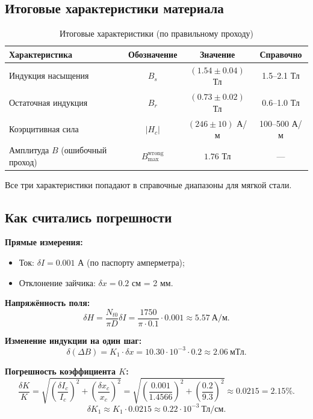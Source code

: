 \documentclass[a4paper]{article}
\begin{document}
	\subsection{Итоговые характеристики материала}
	
	\begin{table}[h]
		\centering
		\caption{Итоговые характеристики (по правильному проходу)}
		\label{tab:numerical_results}
		\begin{tabular}{|l|c|c|c|}
			\hline
			Характеристика & Обозначение & Значение & Справочно \\
			\hline
			Индукция насыщения & $B_s$ & $(1.54 \pm 0.04)$ Тл & 1.5--2.1 Тл \\
			\hline
			Остаточная индукция & $B_r$ & $(0.73 \pm 0.02)$ Тл & 0.6--1.0 Тл \\
			\hline
			Коэрцитивная сила & $|H_c|$ & $(246 \pm 10)$ А/м & 100--500 А/м \\
			\hline
			Амплитуда $B$ (ошибочный проход) & $B_{\max}^{\text{wrong}}$ & $1.76$ Тл & --- \\
			\hline
		\end{tabular}
	\end{table}
	
	Все три характеристики попадают в справочные диапазоны для мягкой стали.
	
	\subsection{Как считались погрешности}
	
	\textbf{Прямые измерения:}
	\begin{itemize}
		\item Ток: $\delta I = 0.001$ А (по паспорту амперметра);
		\item Отклонение зайчика: $\delta x = 0.2$ см = 2 мм.
	\end{itemize}
	
	\textbf{Напряжённость поля:}
	\[
	\delta H = \frac{N_{t0}}{\pi D} \delta I = \frac{1750}{\pi \cdot 0.1} \cdot 0.001 \approx 5.57 \ \text{А/м}.
	\]
	
	\textbf{Изменение индукции на один шаг:}
	\[
	\delta(\Delta B) = K_1 \cdot \delta x = 10.30 \cdot 10^{-3} \cdot 0.2 \approx 2.06 \ \text{мТл}.
	\]
	
	\textbf{Погрешность коэффициента $K$:}
	\[
	\frac{\delta K}{K} = \sqrt{\left(\frac{\delta I_c}{I_c}\right)^2 + \left(\frac{\delta x_c}{x_c}\right)^2}
	= \sqrt{\left(\frac{0.001}{1.4566}\right)^2 + \left(\frac{0.2}{9.3}\right)^2} \approx 0.0215 = 2.15\%.
	\]
	\[
	\delta K_1 \approx K_1 \cdot 0.0215 \approx 0.22 \cdot 10^{-3} \ \text{Тл/см}.
	\]
	
\end{document}
